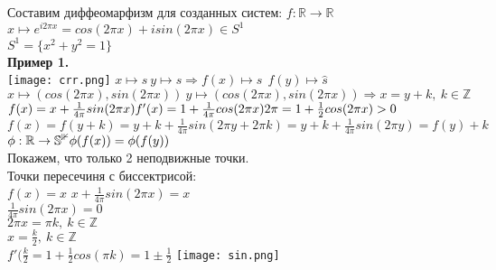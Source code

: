 \documentclass[12pt,a4paper]{article}
\begin{document}
\newpage
Составим диффеомарфизм для созданных систем:
\(f:\mathbb{R}\to \mathbb{R}\)\\
\(x\mapsto e^{i2\pi x} = cos(2\pi x)+ i sin(2\pi x) \in S^1\)\\
\(S^1 = \{x^2 + y^2 =1\}\)\\
\textbf{Пример 1.}\\
\texttt{[image: crr.png]}
\(x\mapsto s \ y\mapsto s \Rightarrow f(x)\mapsto \hat{s}\ \ f(y)\mapsto \hat{s}\)\\
\(x\mapsto (cos(2\pi x), sin(2\pi x))\ y\mapsto (cos(2\pi x), sin(2\pi x)) \Rightarrow x=y+k, \ k\in \mathbb{Z}\)\\
\(f(x)= x + \frac{1}{4\pi} sin(2\pi x)\\ f'(x)=1 + \frac{1}{4\pi} cos(2\pi x)2\pi = 1+ \frac{1}{2} cos(2\pi x) >0\)\\
\(f(x)=f(y+k)= y+k+ \frac{1}{4\pi} sin(2\pi y + 2\pi k)= y+k+\frac{1}{4\pi} sin (2\pi y)=f(y)+k\)\\
\(\phi: \mathbb{R}\to \mathbb{S^1}\\ \phi(f(x))= \phi(f(y))\)\\ Покажем, что только 2 неподвижные точки.\\ Точки пересечиня с биссектрисой:\\
\(f(x)=x\)
\(x+\frac{1}{4\pi} sin(2\pi x)=x\)\\
\(\frac{1}{4\pi} sin(2\pi x)=0\)\\
\(2 \pi x= \pi k, \ k\in \mathbb{Z} \)\\
\(x=\frac{k}{2}, \ k\in \mathbb{Z}\)\\
\(f'(\frac{k}{2}= 1+ \frac{1}{2} cos(\pi k)= 1\pm \frac{1}{2}\)
\texttt{[image: sin.png]}\\
\newpage
\end{document}

